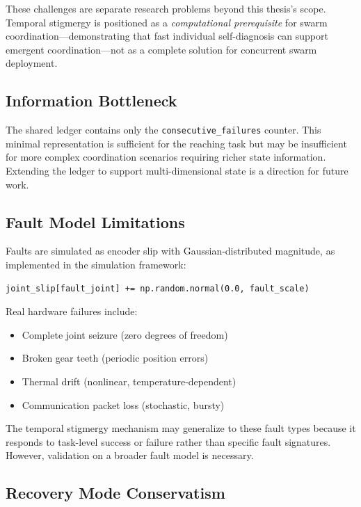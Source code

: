 \documentclass[12pt,a4paper,oneside]{report}
\begin{document}
These challenges are separate research problems beyond this thesis's scope. Temporal stigmergy is positioned as a \textit{computational prerequisite} for swarm coordination—demonstrating that fast individual self-diagnosis can support emergent coordination—not as a complete solution for concurrent swarm deployment.

\subsection{Information Bottleneck}
\label{subsec:information_bottleneck}

The shared ledger contains only the \texttt{consecutive\_failures} counter. This minimal representation is sufficient for the reaching task but may be insufficient for more complex coordination scenarios requiring richer state information. Extending the ledger to support multi-dimensional state is a direction for future work.

\subsection{Fault Model Limitations}
\label{subsec:fault_model_limitations}

Faults are simulated as encoder slip with Gaussian-distributed magnitude, as implemented in the simulation framework:

\begin{verbatim}
joint_slip[fault_joint] += np.random.normal(0.0, fault_scale)
\end{verbatim}

Real hardware failures include:
\begin{itemize}
    \item Complete joint seizure (zero degrees of freedom)
    \item Broken gear teeth (periodic position errors)
    \item Thermal drift (nonlinear, temperature-dependent)
    \item Communication packet loss (stochastic, bursty)
\end{itemize}

The temporal stigmergy mechanism may generalize to these fault types because it responds to task-level success or failure rather than specific fault signatures. However, validation on a broader fault model is necessary.

\subsection{Recovery Mode Conservatism}
\label{subsec:recovery_mode_conservatism}
\end{document}
